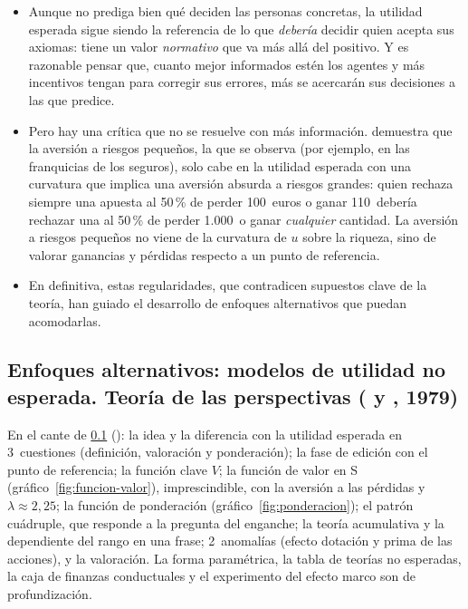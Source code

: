 \documentclass[11pt]{article}
\begin{document}
\begin{itemize}
\item Aunque no prediga bien qué deciden las personas concretas, la utilidad esperada sigue siendo la referencia de lo que \emph{debería} decidir quien acepta sus axiomas: tiene un valor \emph{normativo} que va más allá del positivo. Y es razonable pensar que, cuanto mejor informados estén los agentes y más incentivos tengan para corregir sus errores, más se acercarán sus decisiones a las que predice.
\item Pero hay una crítica que no se resuelve con más información. \textcite{Rabin2000Risk} demuestra que la aversión a riesgos pequeños, la que se observa (por ejemplo, en las franquicias de los seguros), solo cabe en la utilidad esperada con una curvatura que implica una aversión absurda a riesgos grandes: quien rechaza siempre una apuesta al 50\,\% de perder 100~euros o ganar 110~debería rechazar una al 50\,\% de perder 1.000~o ganar \emph{cualquier} cantidad. La aversión a riesgos pequeños no viene de la curvatura de $u$ sobre la riqueza, sino de valorar ganancias y pérdidas respecto a un punto de referencia.
\item En definitiva, estas regularidades, que contradicen supuestos clave de la teoría, han guiado el desarrollo de enfoques alternativos que puedan acomodarlas.
\end{itemize}

\subsection{Enfoques alternativos: modelos de utilidad no esperada.\cortetitulo{} Teoría de las perspectivas ( y , 1979)}\label{sec:perspectivas}

\begin{notaopositor}
En el cante de \ref{sec:perspectivas} (): la idea y la diferencia con la utilidad esperada en 3~cuestiones (definición, valoración y ponderación); la fase de edición con el punto de referencia; la función clave $V$; la función de valor en S (gráfico~\ref{fig:funcion-valor}), imprescindible, con la aversión a las pérdidas y $\lambda\approx 2{,}25$; la función de ponderación (gráfico~\ref{fig:ponderacion}); el patrón cuádruple, que responde a la pregunta del enganche; la teoría acumulativa y la dependiente del rango en una frase; 2~anomalías (efecto dotación y prima de las acciones), y la valoración. La forma paramétrica, la tabla de teorías no esperadas, la caja de finanzas conductuales y el experimento del efecto marco son de profundización.
\end{notaopositor}
\end{document}
